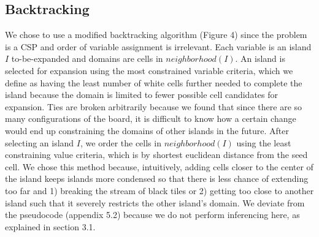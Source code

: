 \documentclass{article}
\theoremstyle{definition}
\begin{document}
\subsection{Backtracking}



We chose to use a modified backtracking algorithm (Figure 4) since the problem is a CSP and order of variable assignment is irrelevant. Each variable is an island $I$ to-be-expanded and domains are cells in $neighborhood(I)$. An island is selected for expansion using the most constrained variable criteria, which we define as having the least number of white cells further needed to complete the island because the domain is limited to fewer possible cell candidates for expansion. Ties are broken arbitrarily because we found that since there are so many configurations of the board, it is difficult to know how a certain change would end up constraining the domains of other islands in the future. After selecting an island $I$, we order the cells in $neighborhood(I)$ using the least constraining value criteria, which is by shortest euclidean distance from the seed cell. We chose this method because, intuitively, adding cells closer to the center of the island keeps islands more condensed so that there is less chance of extending too far and 1) breaking the stream of black tiles or 2) getting too close to another island such that it severely restricts the other island’s domain. We deviate from the pseudocode (appendix 5.2) because we do not perform inferencing here, as explained in section 3.1.
\end{document}

